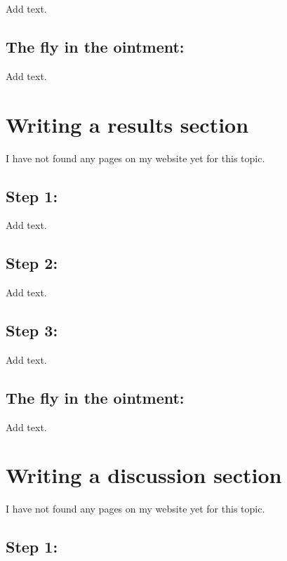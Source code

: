 \documentclass[
  letterpaper,
  DIV=11,
  numbers=noendperiod]{scrreprt}
\begin{document}
Add text.

\section{The fly in the ointment:}\label{the-fly-in-the-ointment-6}

Add text.


\chapter{Writing a results section}\label{writing-a-results-section}

I have not found any pages on my website yet for this topic.

\section{Step 1:}\label{step-1-1}

Add text.

\section{Step 2:}\label{step-2-1}

Add text.

\section{Step 3:}\label{step-3-1}

Add text.

\section{The fly in the ointment:}\label{the-fly-in-the-ointment-7}

Add text.


\chapter{Writing a discussion
section}\label{writing-a-discussion-section}

I have not found any pages on my website yet for this topic.

\section{Step 1:}\label{step-1-2}
\end{document}
